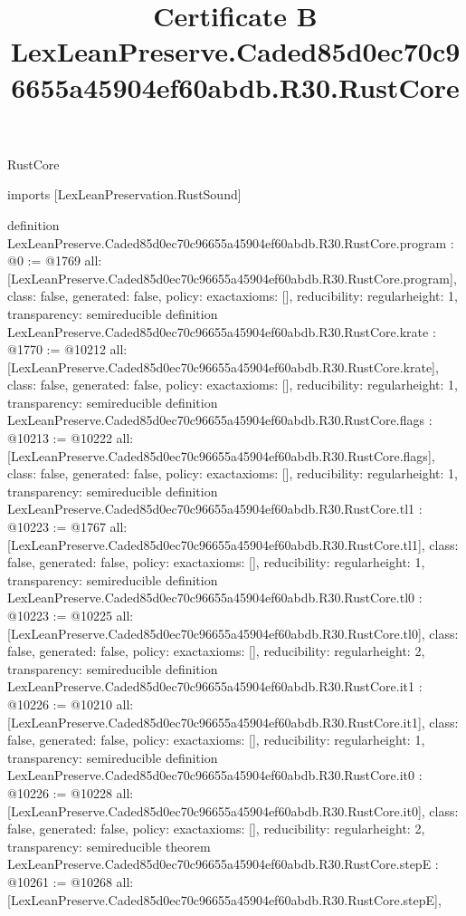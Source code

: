 \begin{lexlean}{RustCore}
\title{Certificate B LexLeanPreserve.Caded85d0ec70c96655a45904ef60abdb.R30.RustCore}
\begin{coremodule}
imports [LexLeanPreservation.RustSound]

definition LexLeanPreserve.Caded85d0ec70c96655a45904ef60abdb.R30.RustCore.program : @0 := @1769 {
  all: [LexLeanPreserve.Caded85d0ec70c96655a45904ef60abdb.R30.RustCore.program],
  class: false,
  generated: false,
  policy: exact{axioms: []},
  reducibility: regular{height: 1},
  transparency: semireducible
}
definition LexLeanPreserve.Caded85d0ec70c96655a45904ef60abdb.R30.RustCore.krate : @1770 := @10212 {
  all: [LexLeanPreserve.Caded85d0ec70c96655a45904ef60abdb.R30.RustCore.krate],
  class: false,
  generated: false,
  policy: exact{axioms: []},
  reducibility: regular{height: 1},
  transparency: semireducible
}
definition LexLeanPreserve.Caded85d0ec70c96655a45904ef60abdb.R30.RustCore.flags : @10213 := @10222 {
  all: [LexLeanPreserve.Caded85d0ec70c96655a45904ef60abdb.R30.RustCore.flags],
  class: false,
  generated: false,
  policy: exact{axioms: []},
  reducibility: regular{height: 1},
  transparency: semireducible
}
definition LexLeanPreserve.Caded85d0ec70c96655a45904ef60abdb.R30.RustCore.tl1 : @10223 := @1767 {
  all: [LexLeanPreserve.Caded85d0ec70c96655a45904ef60abdb.R30.RustCore.tl1],
  class: false,
  generated: false,
  policy: exact{axioms: []},
  reducibility: regular{height: 1},
  transparency: semireducible
}
definition LexLeanPreserve.Caded85d0ec70c96655a45904ef60abdb.R30.RustCore.tl0 : @10223 := @10225 {
  all: [LexLeanPreserve.Caded85d0ec70c96655a45904ef60abdb.R30.RustCore.tl0],
  class: false,
  generated: false,
  policy: exact{axioms: []},
  reducibility: regular{height: 2},
  transparency: semireducible
}
definition LexLeanPreserve.Caded85d0ec70c96655a45904ef60abdb.R30.RustCore.it1 : @10226 := @10210 {
  all: [LexLeanPreserve.Caded85d0ec70c96655a45904ef60abdb.R30.RustCore.it1],
  class: false,
  generated: false,
  policy: exact{axioms: []},
  reducibility: regular{height: 1},
  transparency: semireducible
}
definition LexLeanPreserve.Caded85d0ec70c96655a45904ef60abdb.R30.RustCore.it0 : @10226 := @10228 {
  all: [LexLeanPreserve.Caded85d0ec70c96655a45904ef60abdb.R30.RustCore.it0],
  class: false,
  generated: false,
  policy: exact{axioms: []},
  reducibility: regular{height: 2},
  transparency: semireducible
}
theorem LexLeanPreserve.Caded85d0ec70c96655a45904ef60abdb.R30.RustCore.stepE : @10261 := @10268 {
  all: [LexLeanPreserve.Caded85d0ec70c96655a45904ef60abdb.R30.RustCore.stepE],
}
\end{coremodule}
\end{lexlean}
